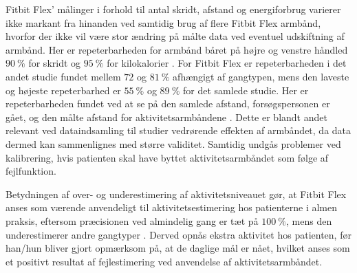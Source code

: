 Fitbit Flex' målinger i forhold til antal skridt, afstand og energiforbrug varierer ikke markant fra hinanden ved samtidig brug af flere Fitbit Flex armbånd, hvorfor der ikke vil være stor ændring på målte data ved eventuel udskiftning af armbånd. Her er repeterbarheden for armbånd båret på højre og venstre håndled $90~\%$ for skridt og $95~\%$ for kilokalorier \citep{evenson2015}. For Fitbit Flex er repeterbarheden i det andet studie fundet mellem $72$ og $81~\%$ afhængigt af gangtypen, mens den laveste og højeste repeterbarhed er $55~\%$ og $89~\%$ for det samlede studie. Her er repeterbarheden fundet ved at se på den samlede afstand, forsøgspersonen er gået, og den målte afstand for aktivitetsarmbåndene \citep{kaewkannate2016}. Dette er blandt andet relevant ved dataindsamling til studier vedrørende effekten af armbåndet, da data dermed kan sammenlignes med større validitet. Samtidig undgås problemer ved kalibrering, hvis patienten skal have byttet aktivitetsarmbåndet som følge af fejlfunktion.

Betydningen af over- og underestimering af aktivitetsniveauet gør, at Fitbit Flex anses som værende anvendeligt til aktivitetsestimering hos patienterne i almen praksis, eftersom præcisionen ved almindelig gang er tæt på $100~\%$, mens den underestimerer andre gangtyper \citep{kaewkannate2016}. Derved opnås ekstra aktivitet hos patienten, før han/hun bliver gjort opmærksom på, at de daglige mål er nået, hvilket anses som et positivt resultat af fejlestimering ved anvendelse af aktivitetsarmbåndet.